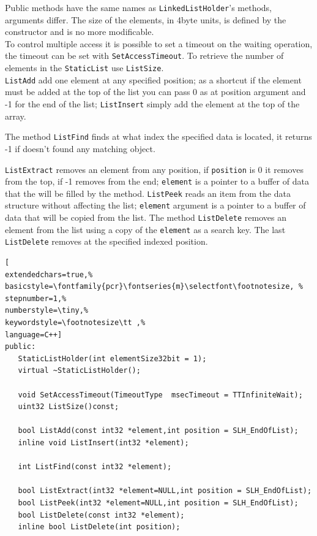 Public methods have the same names as \texttt{LinkedListHolder}'s methods, arguments differ. The size of the elements, in 4byte units, is defined by the constructor and is no more modificable.\\


To control multiple access it is possible to set a timeout on the waiting operation, the timeout can be set with \texttt{SetAccessTimeout}. To retrieve the number of elements in the \texttt{StaticList} use \texttt{ListSize}.\\


\texttt{ListAdd} add one element at any specified position; as a shortcut if the element must be added at the top of the list you can pass 0 as at position argument and -1 for the end of the list; \texttt{ListInsert} simply add the element at the top of the array.

The method \texttt{ListFind} finds at what index the specified data is located, it returns -1 if doesn't found any matching object.

\texttt{ListExtract} removes an element from any position, if \texttt{position} is 0 it removes from the top, if -1 removes from the end; \texttt{element} is a pointer to a buffer of data that the will be filled by the method. \texttt{ListPeek} reads an item from the data structure without affecting the list; \texttt{element} argument is a pointer to a buffer of data that will be copied from the list. The method \texttt{ListDelete} removes an element from the list using a copy of the \texttt{element} as a search key. The last \texttt{ListDelete} removes at the specified indexed position.

\begin{lstlisting}[
extendedchars=true,%
basicstyle=\fontfamily{pcr}\fontseries{m}\selectfont\footnotesize, %
stepnumber=1,%
numberstyle=\tiny,%
keywordstyle=\footnotesize\tt ,%
language=C++]
public:
   StaticListHolder(int elementSize32bit = 1);
   virtual ~StaticListHolder();

   void SetAccessTimeout(TimeoutType  msecTimeout = TTInfiniteWait);
   uint32 ListSize()const;

   bool ListAdd(const int32 *element,int position = SLH_EndOfList);
   inline void ListInsert(int32 *element);

   int ListFind(const int32 *element);

   bool ListExtract(int32 *element=NULL,int position = SLH_EndOfList);
   bool ListPeek(int32 *element=NULL,int position = SLH_EndOfList);
   bool ListDelete(const int32 *element);
   inline bool ListDelete(int position);
\end{lstlisting}



